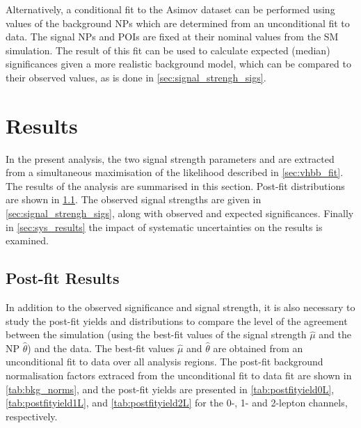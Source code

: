 Alternatively, a conditional fit to the Asimov dataset can be performed using values of the background NPs which are determined from an unconditional fit to data.
The signal NPs and POIs are fixed at their nominal values from the SM simulation.
The result of this fit can be used to calculate expected (median) significances given a more realistic background model, which can be compared to their observed values, as is done in \cref{sec:signal_strengh_sigs}.

\section{Results}\label{sec:vhbb_results}

In the present analysis, the two signal strength parameters \muVH and \muVZ are extracted from a simultaneous maximisation of the likelihood described in \cref{sec:vhbb_fit}.
The results of the analysis are summarised in this section.
Post-fit \mJ distributions are shown in \cref{sec:postfit_plots}.
The observed signal strengths are given in \cref{sec:signal_strengh_sigs}, along with observed and expected significances.
Finally in \cref{sec:sys_results} the impact of systematic uncertainties on the results is examined.



\subsection{Post-fit Results}\label{sec:postfit_plots}

In addition to the observed significance and signal strength, it is also necessary to study the post-fit \mJ yields and  distributions to compare the level of the agreement between the simulation (using the best-fit values of the signal strength $\hat{\mu}$ and the NP $\hat{\theta}$) and the data.
The best-fit values $\hat{\mu}$ and $\hat{\theta}$ are obtained from an unconditional fit to data over all analysis regions.
The post-fit background normalisation factors extraced from the unconditional fit to data fit are shown in \cref{tab:bkg_norms}, and the post-fit yields are presented in \cref{tab:postfityield0L}, \cref{tab:postfityield1L}, and \cref{tab:postfityield2L} for the 0-, 1- and 2-lepton channels, respectively.





